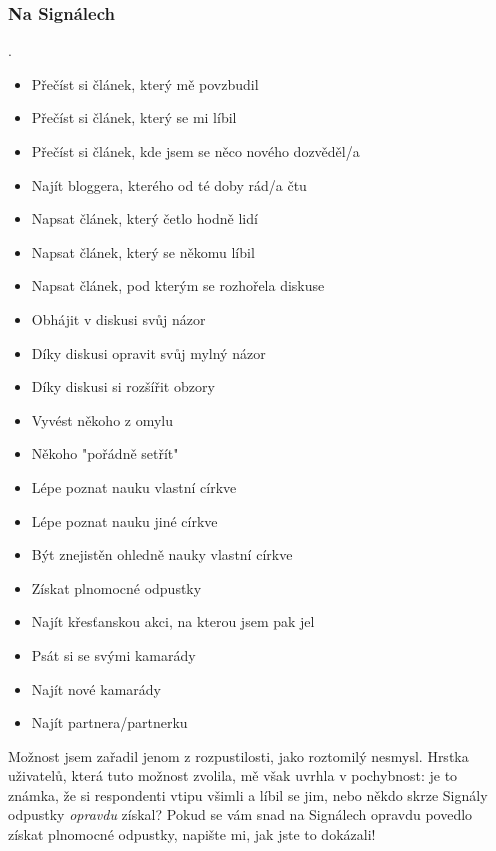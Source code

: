 
\subsubsection{Na Signálech }\label{sec:uspechy}

\qtype \pickMultiple \withOther.

\begin{itemize}
\item Přečíst si článek, který mě povzbudil
\item Přečíst si článek, který se mi líbil
\item Přečíst si článek, kde jsem se něco nového dozvěděl/a
\item Najít bloggera, kterého od té doby rád/a čtu
\item Napsat článek, který četlo hodně lidí
\item Napsat článek, který se někomu líbil
\item Napsat článek, pod kterým se rozhořela diskuse
\item Obhájit v diskusi svůj názor
\item Díky diskusi opravit svůj mylný názor
\item Díky diskusi si rozšířit obzory
\item Vyvést někoho z omylu
\item Někoho "pořádně setřít"
\item Lépe poznat nauku vlastní církve
\item Lépe poznat nauku jiné církve
\item Být znejistěn ohledně nauky vlastní církve
\item Získat plnomocné odpustky
\item Najít křesťanskou akci, na kterou jsem pak jel
\item Psát si se svými kamarády
\item Najít nové kamarády
\item Najít partnera/partnerku
\end{itemize}


{\footnotesize
  Možnost  jsem zařadil jenom
  z rozpustilosti, jako roztomilý nesmysl. Hrstka uživatelů,
  která tuto možnost zvolila, mě však uvrhla v pochybnost:
  je to známka, že si respondenti vtipu všimli a líbil se jim,
  nebo někdo skrze Signály odpustky \emph{opravdu} získal?
  Pokud se vám snad na Signálech opravdu povedlo získat plnomocné
  odpustky, napište mi, jak jste to dokázali!
}


